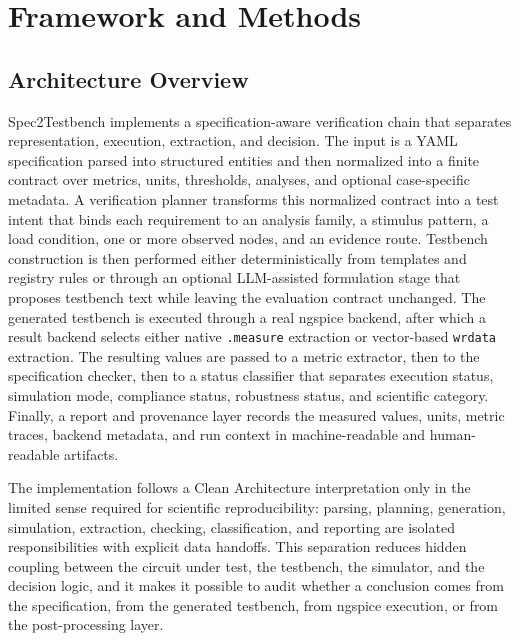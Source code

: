 \section{Framework and Methods}

\subsection{Architecture Overview}
Spec2Testbench implements a specification-aware verification chain that separates representation, execution, extraction, and decision. The input is a YAML specification parsed into structured entities and then normalized into a finite contract over metrics, units, thresholds, analyses, and optional case-specific metadata. A verification planner transforms this normalized contract into a test intent that binds each requirement to an analysis family, a stimulus pattern, a load condition, one or more observed nodes, and an evidence route. Testbench construction is then performed either deterministically from templates and registry rules or through an optional LLM-assisted formulation stage that proposes testbench text while leaving the evaluation contract unchanged. The generated testbench is executed through a real ngspice backend, after which a result backend selects either native \texttt{.measure} extraction or vector-based \texttt{wrdata} extraction. The resulting values are passed to a metric extractor, then to the specification checker, then to a status classifier that separates execution status, simulation mode, compliance status, robustness status, and scientific category. Finally, a report and provenance layer records the measured values, units, metric traces, backend metadata, and run context in machine-readable and human-readable artifacts.

The implementation follows a Clean Architecture interpretation only in the limited sense required for scientific reproducibility: parsing, planning, generation, simulation, extraction, checking, classification, and reporting are isolated responsibilities with explicit data handoffs. This separation reduces hidden coupling between the circuit under test, the testbench, the simulator, and the decision logic, and it makes it possible to audit whether a conclusion comes from the specification, from the generated testbench, from ngspice execution, or from the post-processing layer.

